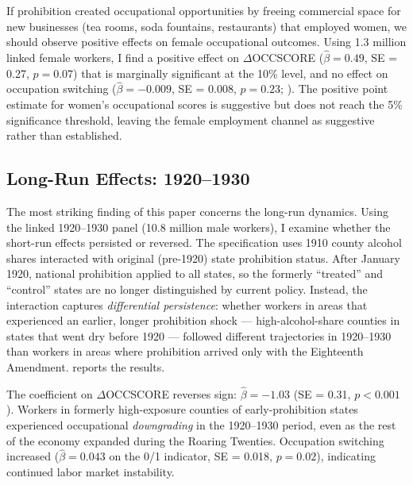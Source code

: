 \documentclass[12pt]{article}
\begin{document}
If prohibition created occupational opportunities by freeing commercial space for new businesses (tea rooms, soda fountains, restaurants) that employed women, we should observe positive effects on female occupational outcomes. Using 1.3 million linked female workers, I find a positive effect on $\Delta$OCCSCORE ($\hat{\beta} = 0.49$, SE = 0.27, $p = 0.07$) that is marginally significant at the 10\% level, and no effect on occupation switching ($\hat{\beta} = -0.009$, SE = 0.008, $p = 0.23$; ). The positive point estimate for women's occupational scores is suggestive but does not reach the 5\% significance threshold, leaving the female employment channel as suggestive rather than established.

\subsection{Long-Run Effects: 1920--1930}
\label{sec:longrun}

The most striking finding of this paper concerns the long-run dynamics. Using the linked 1920--1930 panel (10.8 million male workers), I examine whether the short-run effects persisted or reversed. The specification uses 1910 county alcohol shares interacted with original (pre-1920) state prohibition status. After January 1920, national prohibition applied to all states, so the formerly ``treated'' and ``control'' states are no longer distinguished by current policy. Instead, the interaction captures \emph{differential persistence}: whether workers in areas that experienced an earlier, longer prohibition shock --- high-alcohol-share counties in states that went dry before 1920 --- followed different trajectories in 1920--1930 than workers in areas where prohibition arrived only with the Eighteenth Amendment.  reports the results.

The coefficient on $\Delta$OCCSCORE reverses sign: $\hat{\beta} = -1.03$ (SE = 0.31, $p < 0.001$). Workers in formerly high-exposure counties of early-prohibition states experienced occupational \emph{downgrading} in the 1920--1930 period, even as the rest of the economy expanded during the Roaring Twenties. Occupation switching increased ($\hat{\beta} = 0.043$ on the 0/1 indicator, SE = 0.018, $p = 0.02$), indicating continued labor market instability.

\begin{table}[H]
\centering
\caption{Long-Run Effects: 1920--1930 (Differential Persistence)}
\label{tab:longrun}

\end{table}
\end{document}
